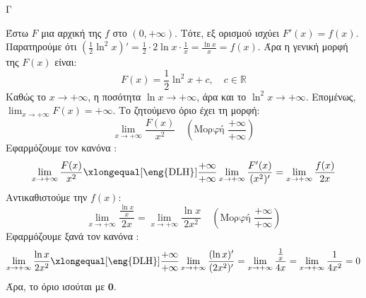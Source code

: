 \begin{thema}{Γ}
\begin{erwthma}
\item Έστω $F$ μια αρχική της $f$ στο $(0, +\infty)$. Τότε, εξ ορισμού ισχύει $F'(x) = f(x)$.
Παρατηρούμε ότι $\left( \frac{1}{2}\ln^2 x \right)' = \frac{1}{2} \cdot 2\ln x \cdot \frac{1}{x} = \frac{\ln x}{x} = f(x)$.
Άρα η γενική μορφή της $F(x)$ είναι:
\[ F(x) = \frac{1}{2}\ln^2 x + c, \quad c \in \mathbb{R} \]
Καθώς το $x \to +\infty$, η ποσότητα $\ln x \to +\infty$, άρα και το $\ln^2 x \to +\infty$.
Επομένως, $\lim_{x \to +\infty} F(x) = +\infty$. Το ζητούμενο όριο έχει τη μορφή:
\[ \lim_{x \to +\infty} \frac{F(x)}{x^2} \quad \left( \text{Μορφή } \frac{+\infty}{+\infty} \right) \]
Εφαρμόζουμε τον κανόνα :
\[ \lim_{x \to +\infty} \frac{F(x)}{x^2} \xlongequal[\text{\eng{DLH}}]{\frac{+\infty}{+\infty}} \lim_{x \to +\infty} \frac{F'(x)}{(x^2)'} = \lim_{x \to +\infty} \frac{f(x)}{2x} \]
Αντικαθιστούμε την $f(x)$:
\[ \lim_{x \to +\infty} \frac{\frac{\ln x}{x}}{2x} = \lim_{x \to +\infty} \frac{\ln x}{2x^2} \quad \left( \text{Μορφή } \frac{+\infty}{+\infty} \right) \]
Εφαρμόζουμε ξανά τον κανόνα :
\[ \lim_{x \to +\infty} \frac{\ln x}{2x^2} \xlongequal[\text{\eng{DLH}}]{\frac{+\infty}{+\infty}} \lim_{x \to +\infty} \frac{(\ln x)'}{(2x^2)'} = \lim_{x \to +\infty} \frac{\frac{1}{x}}{4x} = \lim_{x \to +\infty} \frac{1}{4x^2} = 0 \]
Άρα, το όριο ισούται με $\boldsymbol{0}$.
\end{erwthma}
\end{thema}
